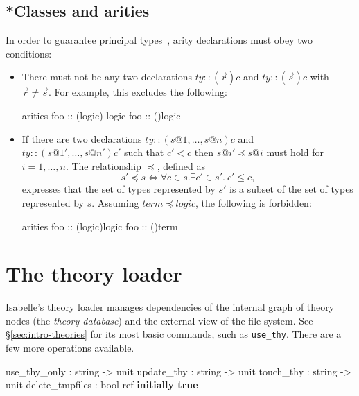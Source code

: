 \subsection{*Classes and arities}

In order to guarantee principal types~\cite{nipkow-prehofer},
arity declarations must obey two conditions:
\begin{itemize}
\item There must not be any two declarations $ty :: (\vec{r})c$ and
  $ty :: (\vec{s})c$ with $\vec{r} \neq \vec{s}$.  For example, this
  excludes the following:
\begin{ttbox}
arities
  foo :: ({\ttlbrace}logic{\ttrbrace}) logic
  foo :: ({\ttlbrace}{\ttrbrace})logic
\end{ttbox}

\item If there are two declarations $ty :: (s@1,\dots,s@n)c$ and $ty ::
  (s@1',\dots,s@n')c'$ such that $c' < c$ then $s@i' \preceq s@i$ must hold
  for $i=1,\dots,n$.  The relationship $\preceq$, defined as
\[ s' \preceq s \iff \forall c\in s. \exists c'\in s'.~ c'\le c, \]
expresses that the set of types represented by $s'$ is a subset of the
set of types represented by $s$.  Assuming $term \preceq logic$, the
following is forbidden:
\begin{ttbox}
arities
  foo :: ({\ttlbrace}logic{\ttrbrace})logic
  foo :: ({\ttlbrace}{\ttrbrace})term
\end{ttbox}

\end{itemize}


\section{The theory loader}\label{sec:more-theories}

Isabelle's theory loader manages dependencies of the internal graph of theory
nodes (the \emph{theory database}) and the external view of the file system.
See \S\ref{sec:intro-theories} for its most basic commands, such as
\texttt{use_thy}.  There are a few more operations available.

\begin{ttbox}
use_thy_only    : string -> unit
update_thy      : string -> unit
touch_thy       : string -> unit
delete_tmpfiles : bool ref \hfill{\bf initially true}
\end{ttbox}

